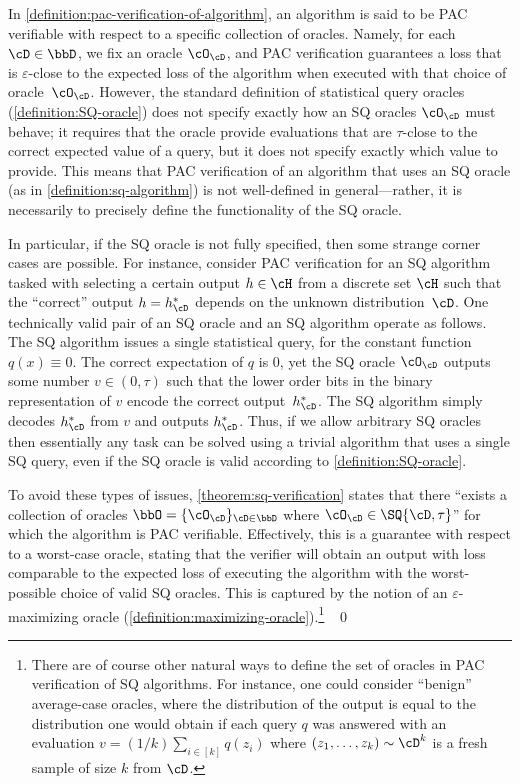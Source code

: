 \begin{remark}
	In \cref{definition:pac-verification-of-algorithm}, an algorithm is said to be PAC verifiable with respect to a specific collection of oracles. Namely, for each $\cD \in \bbD$, we fix an oracle $\cO_\cD$, and PAC verification guarantees a loss that is $\varepsilon$-close to the expected loss of the algorithm when executed with that choice of oracle~$\cO_\cD$. However, the standard definition of statistical query oracles (\cref{definition:SQ-oracle}) does not specify exactly how an SQ oracles $\cO_\cD$ must behave; it requires that the oracle provide evaluations  that are $\tau$-close to the correct expected value of a query, but it does not specify exactly which value to provide. This means that PAC verification of an algorithm that uses an SQ oracle (as in \cref{definition:sq-algorithm}) is not well-defined in general---rather, it is necessarily to precisely define the functionality of the SQ oracle. 

	In particular, if the SQ oracle is not fully specified, then some strange corner cases are possible. For instance, consider PAC verification for an SQ algorithm tasked with selecting a certain output $h \in \cH$ from a discrete set $\cH$ such that the ``correct'' output $h=h^*_\cD$ depends on the unknown distribution~$\cD$. One technically valid pair of an SQ oracle and an SQ algorithm operate as follows. The SQ algorithm issues a single statistical query, for the constant function $q(x) \equiv 0$. The correct expectation of $q$ is $0$, yet the SQ oracle $\cO_\cD$ outputs some number $v \in (0,\tau)$ such that the lower order bits in the binary representation of $v$ encode the correct output~$h^*_\cD$. The SQ algorithm simply decodes $h^*_\cD$ from $v$ and outputs $h^*_\cD$. Thus, if we allow arbitrary SQ oracles then essentially any task can be solved using a trivial algorithm that uses a single SQ query, even if the SQ oracle is valid according to \cref{definition:SQ-oracle}.

	To avoid these types of issues, \cref{theorem:sq-verification} states that there ``exists a collection of oracles $\bbO = \{\cO_\cD\}_{\cD \in \bbD}$ where $\cO_\cD \in \SQ{\cD,\tau}$'' for which the algorithm is PAC verifiable. Effectively, this is a guarantee with respect to a worst-case oracle, stating that the verifier will obtain an output with loss comparable to the expected loss of executing the algorithm with the worst-possible choice of valid SQ oracles. This is captured by the notion of an $\varepsilon$-maximizing oracle (\cref{definition:maximizing-oracle}).\footnote{
		There are of course other natural ways to define the set of oracles in PAC verification of SQ algorithms. For instance, one could consider ``benign'' average-case oracles, where the distribution of the output is equal to the distribution one would obtain if each query $q$ was answered with an evaluation $v = (1/k)\sum_{i \in [k]}q(z_i)$ where $(z_1,\dots,z_k)\sim \cD^k$ is a fresh sample of size $k$ from $\cD$.
	}
	~\qed
\end{remark}


